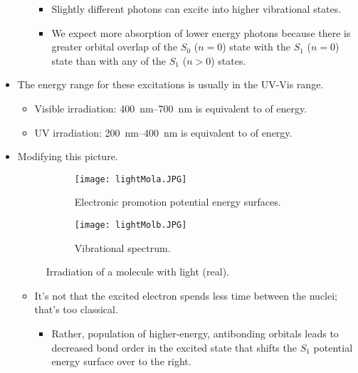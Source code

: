 \documentclass[../notes.tex]{subfiles}
\begin{document}
\begin{itemize}
\begin{itemize}
        \begin{itemize}
            \item Slightly different photons can excite into higher vibrational states.
            \item We expect more absorption of lower energy photons because there is greater orbital overlap of the $S_0$ ($n=0$) state with the $S_1$ ($n=0$) state than with any of the $S_1$ ($n>0$) states.
        \end{itemize}
    \end{itemize}
    \pagebreak
    \item The energy range for these excitations is usually in the UV-Vis range.
    \begin{itemize}
        \item Visible irradiation: \SIrange{400}{700}{\nano\meter} is equivalent to  of energy.
        \item UV irradiation: \SIrange{200}{400}{\nano\meter} is equivalent to  of energy.
    \end{itemize}
    \item Modifying this picture.
    \begin{figure}[h!]
        \centering
        \begin{subfigure}[b]{0.49\linewidth}
            \centering
            \texttt{[image: lightMola.JPG]}
            \caption{Electronic promotion potential energy surfaces.}
            \label{fig:lightMola}
        \end{subfigure}
        \begin{subfigure}[b]{0.35\linewidth}
            \centering
            \texttt{[image: lightMolb.JPG]}
            \caption{Vibrational spectrum.}
            \label{fig:lightMolb}
        \end{subfigure}
        \caption{Irradiation of a molecule with light (real).}
        \label{fig:lightMol}
    \end{figure}
    \begin{itemize}
        \item It's not that the excited electron spends less time between the nuclei; that's too classical.
        \begin{itemize}
            \item Rather, population of higher-energy, antibonding orbitals leads to decreased bond order in the excited state that shifts the $S_1$ potential energy surface over to the right.
        \end{itemize}

\end{itemize}
\end{itemize}
\end{document}

